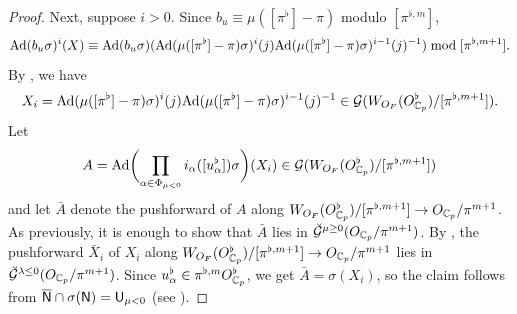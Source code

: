 \documentclass[12pt,reqno]{amsart}
\begin{document}
\begin{proof}
    Next, suppose $i > 0$. Since $b_u \equiv \mu([\pi^\flat] - \pi)$ modulo $[\pi^{\flat, m}]$, 
    \[
        {\operatorname{Ad}}(b_u\sigma)^i(X) \equiv {\operatorname{Ad}}(b_u \sigma)({\operatorname{Ad}}(\mu([\pi^\flat] - \pi) \sigma)^i(j) {\operatorname{Ad}}(\mu([\pi^\flat] - \pi) \sigma)^{i-1}(j)^{-1} ) \bmod{[\pi^{\flat, m+1}]}. 
    \]
    By , we have
    \[
        X_i = {\operatorname{Ad}}(\mu([\pi^\flat] - \pi) \sigma)^i(j) {\operatorname{Ad}}(\mu([\pi^\flat] - \pi) \sigma)^{i-1}(j)^{-1} \in {\mathcal{G}}(W_{O_F}(O_{\mathbb{C}_p}^\flat) / [\pi^{\flat, m+1}]). 
    \]
    Let
    \[
        A = {\operatorname{Ad}}\biggl(\prod_{\alpha \in \Phi_{\mu < 0}} i_\alpha([u_\alpha^\flat]) \sigma \biggr)(X_i) \in {\mathcal{G}}(W_{O_F}(O_{\mathbb{C}_p}^\flat) / [\pi^{\flat, m+1}])
    \]
    and let $\bar{A}$ denote the pushforward of $A$ along $W_{O_F}(O_{\mathbb{C}_p}^\flat) / [\pi^{\flat, m+1}] \to O_{\mathbb{C}_p} / \pi^{m + 1}$. As previously,  it is enough to show that $\bar{A}$ lies in ${\mathcal{\breve{G}}}^{\mu \geq 0}(O_{\mathbb{C}_p}/\pi^{m + 1})$. By , the pushforward $\bar{X}_i$ of $X_i$ along $W_{O_F}(O_{\mathbb{C}_p}^\flat) / [\pi^{\flat, m+1}] \to O_{\mathbb{C}_p} / \pi^{m + 1}$ lies in $\breve{{\mathcal{G}}}^{\lambda \leq 0}(O_{\mathbb{C}_p} / \pi^{m + 1})$. Since $u_\alpha^\flat \in \pi^{\flat, m} O_{\mathbb{C}_p}^\flat$, we get $\bar{A} = \sigma(X_i)$, so the claim follows from ${\mathsf{{\overline{N}}}} \cap \sigma({\mathsf{N}}) = {\mathsf{U}}_{\mu < 0}$ (see ). 
\end{proof}
\end{document}

